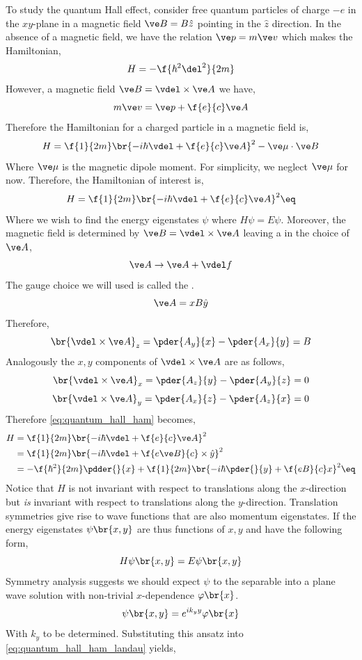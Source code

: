 \documentclass{article}
\begin{document}
To study the quantum Hall effect, consider free quantum particles of charge $-e$ in the $xy$-plane in a magnetic field $\ve B= B \hat z$ pointing in the $\hat z$ direction. In the absence of a magnetic field, we have the relation $\ve p = m \ve v$ which makes the Hamiltonian,
\[  H = - \f{\hbar^2 \del^2}{2m} \]
However, a magnetic field $\ve B = \vdel \times \ve A$ we have,
\[ m \ve v = \ve p + \f{e}{c} \ve A \]
Therefore the Hamiltonian for a charged particle in a magnetic field is,
\[ H = \f{1}{2m} \br{- i \hbar \vdel + \f{e}{c} \ve A}^2 - \ve \mu \cdot \ve B \]
Where $\ve \mu$ is the magnetic dipole moment. For simplicity, we neglect $\ve \mu$ for now. Therefore, the Hamiltonian of interest is,
\[ H = \f{1}{2m} \br{- i \hbar \vdel + \f{e}{c} \ve A}^2 \eq \label{eq:quantum_hall_ham} \]
Where we wish to find the energy eigenstates $\psi$ where $H \psi = E \psi$. Moreover, the magnetic field is determined by $\ve B = \vdel \times \ve A$ leaving a  in the choice of $\ve A$,
\[ \ve A \to \ve A + \vdel f \]
The gauge choice we will used is called the .
\[ \ve A = x B \hat y \]
Therefore,
\[ \br{\vdel \times \ve A}_{z} = \pder{A_y}{x} - \pder{A_x}{y} = B \]
Analogously the $x,y$ components of $\vdel \times \ve A$ are as follows,
\[ \br{\vdel \times \ve A}_{x} = \pder{A_z}{y} - \pder{A_y}{z} = 0 \]
\[ \br{\vdel \times \ve A}_{y} = \pder{A_x}{z} - \pder{A_z}{x} = 0 \]
Therefore \cref{eq:quantum_hall_ham} becomes,
\begin{align*}
    H
    &= \f{1}{2m}\br{- i \hbar \vdel + \f{e}{c} \ve A}^2 \\
    &= \f{1}{2m}\br{- i \hbar \vdel + \f{e\ve B}{c} \times \hat y}^2 \\
    &= - \f{\hbar^2}{2m} \pdder{}{x} + \f{1}{2m}\br{- i \hbar \pder{}{y} + \f{eB}{c}x}^2 \eq \label{eq:quantum_hall_ham_landau}
\end{align*}
Notice that $H$ is not invariant with respect to translations along the $x$-direction but \textit{is} invariant with respect to translations along the $y$-direction. Translation symmetries give rise to wave functions that are also momentum eigenstates. If the energy eigenstates $\psi\br{x,y}$ are thus functions of $x,y$ and have the following form,
\[ H \psi\br{x,y} = E \psi\br{x,y} \]
Symmetry analysis suggests we should expect $\psi$ to the separable into a plane wave solution with non-trivial $x$-dependence $\varphi\br{x}$.
\[ \psi\br{x,y} = e^{i k_y y} \varphi\br{x} \]
With $k_y$ to be determined. Substituting this ansatz into \cref{eq:quantum_hall_ham_landau} yields,
\end{document}
